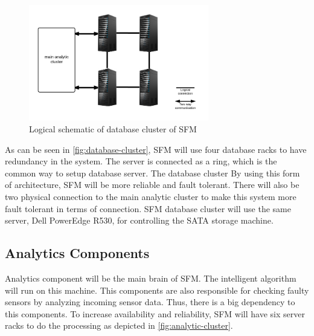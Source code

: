 \begin{figure}[H]
\centering
\includegraphics[width=0.7\textwidth]{6-hardware/images/db-cluster.png}
\caption{Logical schematic of database cluster of SFM}
\label{fig:database-cluster}
\end{figure}

As can be seen in \autoref{fig:database-cluster}, SFM will use four database racks to have redundancy in the system. The server is connected as a ring, which is the common way to setup database server. The database cluster By using this form of architecture, SFM will be more reliable and fault tolerant. There will also be two physical connection to the main analytic cluster to make this system more fault tolerant in terms of connection. SFM database cluster will use the same server, Dell PowerEdge R530, for controlling the SATA storage machine.





\subsection{Analytics Components}
\label{subsec:analytics}
Analytics component will be the main brain of SFM. The intelligent algorithm will run on this machine. This components are also responsible for checking faulty sensors by analyzing incoming sensor data. Thus, there is a big dependency to this components. To increase availability and reliability, SFM will have six server racks to do the processing as depicted in \autoref{fig:analytic-cluster}.

